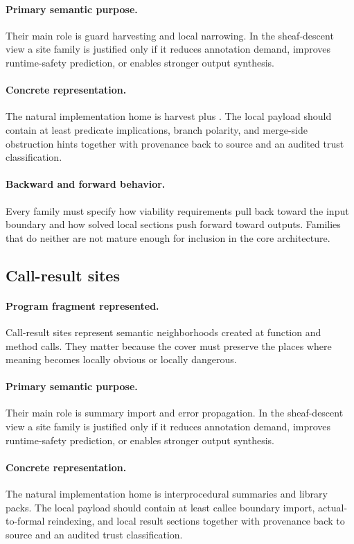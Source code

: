 \documentclass[11pt]{report}
\DeclareRobustCommand{\py}[1]{\texttt{\detokenize{#1}}}
\theoremstyle{definition}
\theoremstyle{plain}
\begin{document}
\paragraph{Primary semantic purpose.}
Their main role is guard harvesting and local narrowing. In the sheaf-descent view a site family is
justified only if it reduces annotation demand, improves runtime-safety
prediction, or enables stronger output synthesis.

\paragraph{Concrete representation.}
The natural implementation home is harvest plus \py{static_analysis}. The local payload should contain
at least predicate implications, branch polarity, and merge-side obstruction hints together with provenance back to source and an audited
trust classification.

\paragraph{Backward and forward behavior.}
Every family must specify how viability requirements pull back toward the
input boundary and how solved local sections push forward toward outputs.
Families that do neither are not mature enough for inclusion in the core
architecture.

\subsection{Call-result sites}

\paragraph{Program fragment represented.}
Call-result sites represent semantic neighborhoods created at function and method calls. They matter because the cover must preserve the
places where meaning becomes locally obvious or locally dangerous.

\paragraph{Primary semantic purpose.}
Their main role is summary import and error propagation. In the sheaf-descent view a site family is
justified only if it reduces annotation demand, improves runtime-safety
prediction, or enables stronger output synthesis.

\paragraph{Concrete representation.}
The natural implementation home is interprocedural summaries and library packs. The local payload should contain
at least callee boundary import, actual-to-formal reindexing, and local result sections together with provenance back to source and an audited
trust classification.
\end{document}
